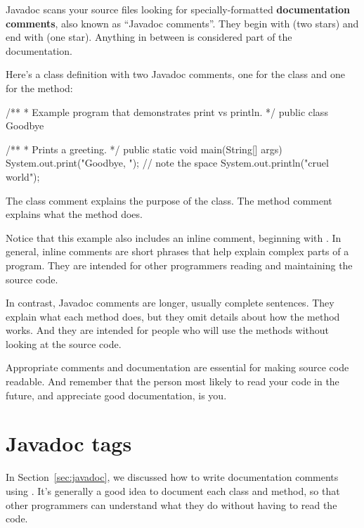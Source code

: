 
Javadoc scans your source files looking for specially-formatted {\bf documentation comments}, also known as ``Javadoc comments''.
They begin with \java{/**} (two stars) and end with \java{*/} (one star).
Anything in between is considered part of the documentation.

Here's a class definition with two Javadoc comments, one for the class and one for the  method:

\begin{code}
/**
 * Example program that demonstrates print vs println.
 */
public class Goodbye {

    /**
     * Prints a greeting.
     */
    public static void main(String[] args) {
        System.out.print("Goodbye, ");  // note the space
        System.out.println("cruel world");
    }
}
\end{code}

The class comment explains the purpose of the class.
The method comment explains what the method does.

Notice that this example also includes an inline comment, beginning with \java{//}.
In general, inline comments are short phrases that help explain complex parts of a program.
They are intended for other programmers reading and maintaining the source code.

In contrast, Javadoc comments are longer, usually complete sentences.
They explain what each method does, but they omit details about how the method works.
And they are intended for people who will use the methods without looking at the source code.

Appropriate comments and documentation are essential for making source code readable.
And remember that the person most likely to read your code in the future, and appreciate good documentation, is you.


\section{Javadoc tags}

In Section~\ref{sec:javadoc}, we discussed how to write documentation comments using \java{/**}.
It's generally a good idea to document each class and method, so that other programmers can understand what they do without having to read the code.



